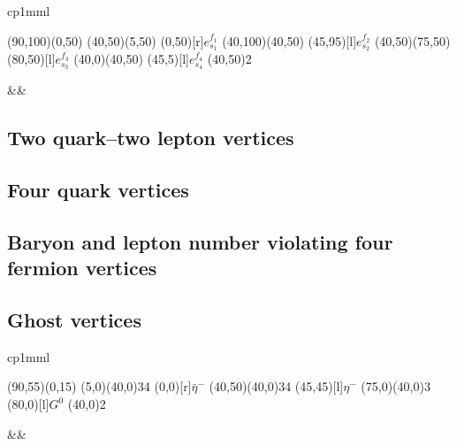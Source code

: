 \documentclass[11pt]{article}
\begin{document}
\bigskip

\noindent \begin{tabular}{cp{1mm}l}
\begin{picture}(90,100)(0,50)
\ArrowLine(40,50)(5,50)
\Text(0,50)[r]{$ e^{f_1}_{s_1}$}
\ArrowLine(40,100)(40,50)
\Text(45,95)[l]{$e^{f_2}_{s_2}$}
\ArrowLine(40,50)(75,50)
\Text(80,50)[l]{$ e^{f_3}_{s_3}$}
\ArrowLine(40,0)(40,50)
\Text(45,5)[l]{$e^{f_4}_{s_4}$}
\Vertex(40,50){2}
\end{picture}
&&
\begin{minipage}[c]{0.8\linewidth}

\end{minipage}
\end{tabular}

\bigskip

\bigskip
\bigskip
\subsection{Two quark--two lepton vertices}

\bigskip
\bigskip
\subsection{Four quark vertices}

\bigskip
\bigskip
\subsection{Baryon and lepton
number violating four fermion vertices}

\bigskip
\bigskip
\bigskip
\subsection{Ghost vertices}

\noindent \begin{tabular}{cp{1mm}l}
\begin{picture}(90,55)(0,15)
\ZigZag(5,0)(40,0){3}{4}
\Text(0,0)[r]{$\bar\eta^-$}
\ZigZag(40,50)(40,0){3}{4}
\Text(45,45)[l]{$\eta^-$}
\DashLine(75,0)(40,0){3}
\Text(80,0)[l]{$G^0$}
\Vertex(40,0){2}
\end{picture}
&&
\begin{minipage}[c]{0.8\linewidth}

\end{minipage}
\end{tabular}

\bigskip
\end{document}
